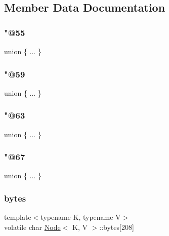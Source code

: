 \subsection{Member Data Documentation}
\mbox{\label{classNode_aff3fa8eb8122c855e459deafc3a453c2}} 
\subsubsection{\texorpdfstring{"@55}{@55}}
{\footnotesize\ttfamily union \{ ... \} }

\mbox{\label{classNode_afd70f5bee4b67e9f5569596faf715b9f}} 
\subsubsection{\texorpdfstring{"@59}{@59}}
{\footnotesize\ttfamily union \{ ... \} }

\mbox{\label{classNode_ae735cb0c206600d8facff92750ed8f12}} 
\subsubsection{\texorpdfstring{"@63}{@63}}
{\footnotesize\ttfamily union \{ ... \} }

\mbox{\label{classNode_a5907a461b4944a4b9aac9d3b71e961a5}} 
\subsubsection{\texorpdfstring{"@67}{@67}}
{\footnotesize\ttfamily union \{ ... \} }

\mbox{\label{classNode_a4a5b8f90ab1220e757685cecea531793}} 
\subsubsection{\texorpdfstring{bytes}{bytes}}
{\footnotesize\ttfamily template$<$typename K, typename V$>$ \\
volatile char \hyperlink{classNode}{Node}$<$ K, V $>$\+::bytes\mbox{[}208\mbox{]}}

\mbox{\label{classNode_a017fd2017e14882deaf39b960d740b7e}} 
